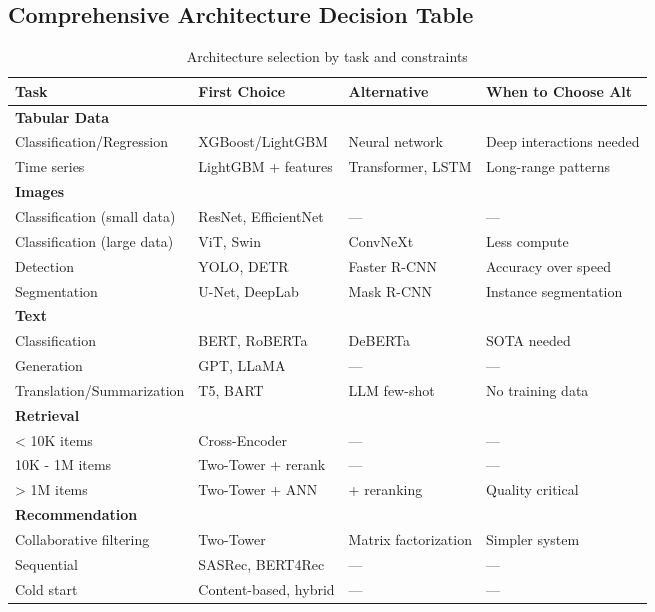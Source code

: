 \subsection{Comprehensive Architecture Decision Table}

\begin{table}[H]
\centering
\caption{Architecture selection by task and constraints}
\begin{tabularx}{\textwidth}{lXXX}
\toprule
\textbf{Task} & \textbf{First Choice} & \textbf{Alternative} & \textbf{When to Choose Alt} \\
\midrule
\multicolumn{4}{l}{\textbf{Tabular Data}} \\
Classification/Regression & XGBoost/LightGBM & Neural network & Deep interactions needed \\
Time series & LightGBM + features & Transformer, LSTM & Long-range patterns \\
\midrule
\multicolumn{4}{l}{\textbf{Images}} \\
Classification (small data) & ResNet, EfficientNet & — & — \\
Classification (large data) & ViT, Swin & ConvNeXt & Less compute \\
Detection & YOLO, DETR & Faster R-CNN & Accuracy over speed \\
Segmentation & U-Net, DeepLab & Mask R-CNN & Instance segmentation \\
\midrule
\multicolumn{4}{l}{\textbf{Text}} \\
Classification & BERT, RoBERTa & DeBERTa & SOTA needed \\
Generation & GPT, LLaMA & — & — \\
Translation/Summarization & T5, BART & LLM few-shot & No training data \\
\midrule
\multicolumn{4}{l}{\textbf{Retrieval}} \\
< 10K items & Cross-Encoder & — & — \\
10K - 1M items & Two-Tower + rerank & — & — \\
> 1M items & Two-Tower + ANN & + reranking & Quality critical \\
\midrule
\multicolumn{4}{l}{\textbf{Recommendation}} \\
Collaborative filtering & Two-Tower & Matrix factorization & Simpler system \\
Sequential & SASRec, BERT4Rec & — & — \\
Cold start & Content-based, hybrid & — & — \\
\bottomrule
\end{tabularx}
\end{table}

